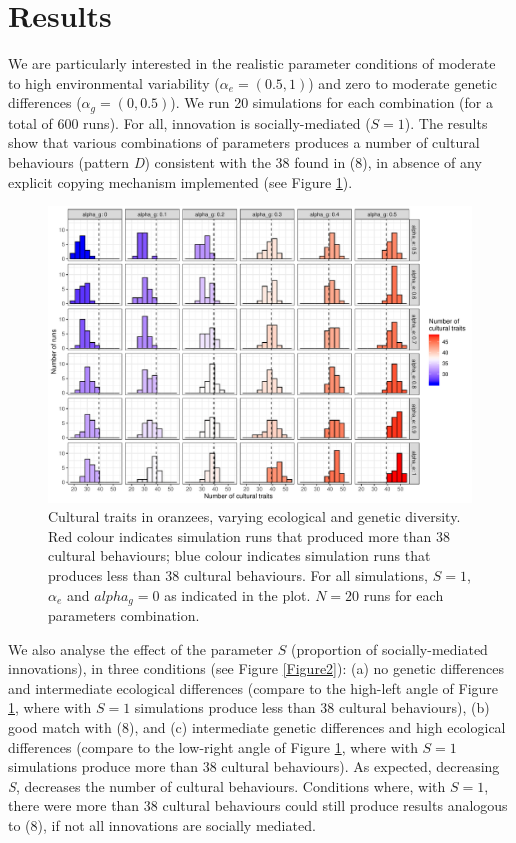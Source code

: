 \documentclass[9pt,twocolumn,twoside,]{pnas-new}
\begin{document}
\section*{Results}\label{results}

We are particularly interested in the realistic parameter conditions of
moderate to high environmental variability (\(\alpha_e=(0.5,1)\)) and
zero to moderate genetic differences (\(\alpha_g=(0,0.5)\)). We run 20
simulations for each combination (for a total of 600 runs). For all,
innovation is socially-mediated (\(S=1\)). The results show that various
combinations of parameters produces a number of cultural behaviours
(pattern \emph{D}) consistent with the 38 found in (8), in absence of
any explicit copying mechanism implemented (see Figure \ref{Figure1}).

\begin{figure}[h!]
\begin{center}
\includegraphics[width=17.8cm]{figures/figure_1.pdf}
\caption{Cultural traits in oranzees, varying ecological and genetic diversity. Red colour indicates simulation runs that produced more than 38 cultural behaviours; blue colour indicates simulation runs that produces less than 38 cultural behaviours. For all simulations, $S=1$, $\alpha_e$ and $alpha_g=0$ as indicated in the plot. $N=20$ runs for each parameters combination.}
\label{Figure1}
\end{center}
\end{figure}

We also analyse the effect of the parameter \(S\) (proportion of
socially-mediated innovations), in three conditions (see Figure
\ref{Figure2}): (a) no genetic differences and intermediate ecological
differences (compare to the high-left angle of Figure \ref{Figure1},
where with \(S=1\) simulations produce less than 38 cultural
behaviours), (b) good match with (8), and (c) intermediate genetic
differences and high ecological differences (compare to the low-right
angle of Figure \ref{Figure1}, where with \(S=1\) simulations produce
more than 38 cultural behaviours). As expected, decreasing \emph{S},
decreases the number of cultural behaviours. Conditions where, with
\(S=1\), there were more than 38 cultural behaviours could still produce
results analogous to (8), if not all innovations are socially mediated.
\end{document}

